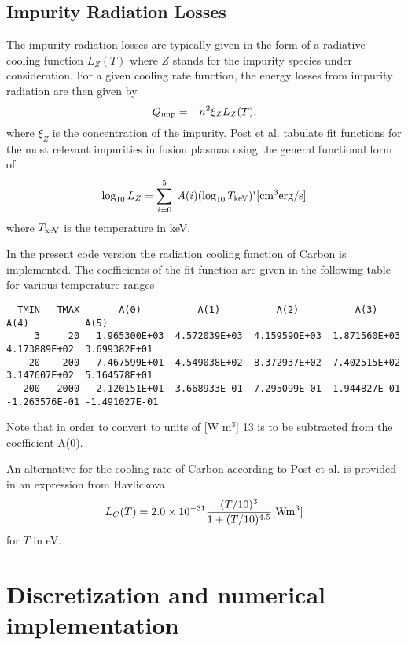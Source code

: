 \documentclass[amsmath,amssymb,a4]{revtex4}
\begin{document}
\subsection{Impurity Radiation Losses}

The impurity radiation losses are typically given in the form of a radiative cooling function $L_Z(T)$ where $Z$ stands for the impurity species under consideration. For a given cooling rate function, the energy losses from impurity radiation are then given by
\begin{equation}\label{impurity_radiation}
    Q_{\rm imp} = - n^2 \xi_Z L_Z(T),
\end{equation}
where $\xi_Z$ is the concentration of the impurity. Post et al.\cite{post1977} tabulate fit functions for the most relevant impurities in fusion plasmas using the general functional form of \cite{post1977}
\begin{equation}\label{cooling_rate}
    \log_{10} L_Z = \sum_{i=0}^5 \; A(i) (\log_{10} T_{\rm keV})^i [{\rm cm}^3 {\rm erg/s}]
\end{equation}
where $T_{\rm keV}$ is the temperature in keV.

In the present code version the radiation cooling function of Carbon is implemented. The coefficients of the fit function are given in the following table for various temperature ranges
\begin{small}\begin{verbatim}
  TMIN   TMAX       A(0)          A(1)          A(2)          A(3)          A(4)          A(5)
     3     20   1.965300E+03  4.572039E+03  4.159590E+03  1.871560E+03  4.173889E+02  3.699382E+01
    20    200   7.467599E+01  4.549038E+02  8.372937E+02  7.402515E+02  3.147607E+02  5.164578E+01
   200   2000  -2.120151E+01 -3.668933E-01  7.295099E-01 -1.944827E-01 -1.263576E-01 -1.491027E-01
\end{verbatim}\end{small}
Note that in order to convert to units of [W m$^3$] 13 is to be subtracted from the coefficient A(0).

An alternative for the cooling rate of Carbon according to Post et al. is provided in an expression from Havlickova \cite{havlickova2013}
\begin{equation}
    L_C(T) = 2.0 \times 10^{-31} {(T/10)^3 \over 1 + (T/10)^{4.5}} [{\rm W m}^3]
\end{equation}
for $T$ in eV.

\section{Discretization and numerical implementation}\label{numerics}
\end{document}
